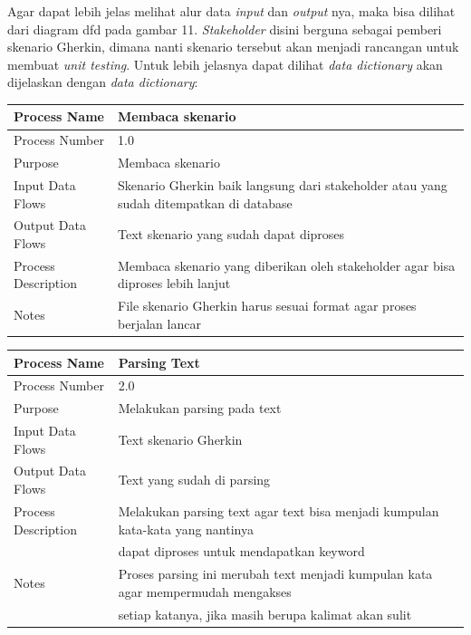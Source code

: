 \documentclass[a4paper,twoside]{article}
\begin{document}
\begin{enumerate}
Agar dapat lebih jelas melihat alur data \textit{input} dan \textit{output} nya, maka bisa dilihat dari diagram dfd pada gambar 11. \textit{Stakeholder} disini berguna sebagai pemberi skenario Gherkin, dimana nanti skenario tersebut akan menjadi rancangan untuk membuat \textit{unit testing}. Untuk lebih jelasnya dapat dilihat \textit{data dictionary} akan dijelaskan dengan \textit{data dictionary}:
\begin{center}
\begin{tabular}{ |l|l| } 
 \hline
 Process Name &  Membaca skenario\\ 
 \hline
 Process Number &  1.0 \\ 
 \hline
 Purpose &  Membaca skenario\\ 
 \hline
 Input Data Flows & Skenario Gherkin baik langsung dari stakeholder atau yang sudah ditempatkan di database \\
 \hline
 Output Data Flows & Text skenario yang sudah dapat diproses \\
 \hline
 Process Description & Membaca skenario yang diberikan oleh stakeholder agar bisa diproses lebih lanjut \\
 \hline
 Notes & File skenario Gherkin harus sesuai format agar proses berjalan lancar\\
 \hline
\end{tabular}
\end{center}

\begin{center}
\begin{tabular}{ |l|l| } 
 \hline
 Process Name &  Parsing Text\\ 
 \hline
 Process Number &  2.0 \\ 
 \hline
 Purpose & Melakukan parsing pada text \\ 
 \hline
 Input Data Flows & Text skenario Gherkin  \\
 \hline
 Output Data Flows & Text yang sudah di parsing \\
 \hline
 Process Description & Melakukan parsing text agar text bisa menjadi kumpulan kata-kata yang nantinya  \\
  & dapat diproses untuk mendapatkan keyword\\
 \hline
 Notes & Proses parsing ini merubah text menjadi kumpulan kata agar mempermudah mengakses\\
 &  setiap katanya, jika masih berupa kalimat akan sulit\\
 \hline
\end{tabular}
\end{center}


\end{enumerate}
\end{document}
